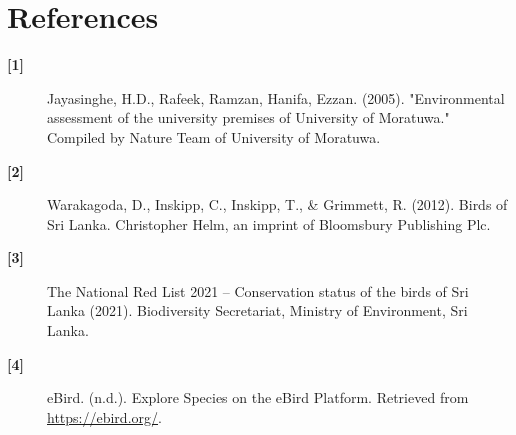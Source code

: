 \chapter{References}
\label{cp:References}

\begin{description}
    \item[\textbf{[1]}] Jayasinghe, H.D., Rafeek, Ramzan, Hanifa, Ezzan. (2005). "Environmental assessment of the university premises of University of Moratuwa." Compiled by Nature Team of University of Moratuwa.
    \\
    \item[\textbf{[2]}] Warakagoda, D., Inskipp, C., Inskipp, T., \& Grimmett, R. (2012). Birds of Sri Lanka. Christopher Helm, an imprint of Bloomsbury Publishing Plc.
    \\
    \item[\textbf{[3]}] The National Red List 2021 – Conservation status of the birds of Sri Lanka (2021). Biodiversity Secretariat, Ministry of Environment, Sri Lanka.
    \\
    \item[\textbf{[4]}] eBird. (n.d.). Explore Species on the eBird Platform. Retrieved from \url{https://ebird.org/}.
\end{description}